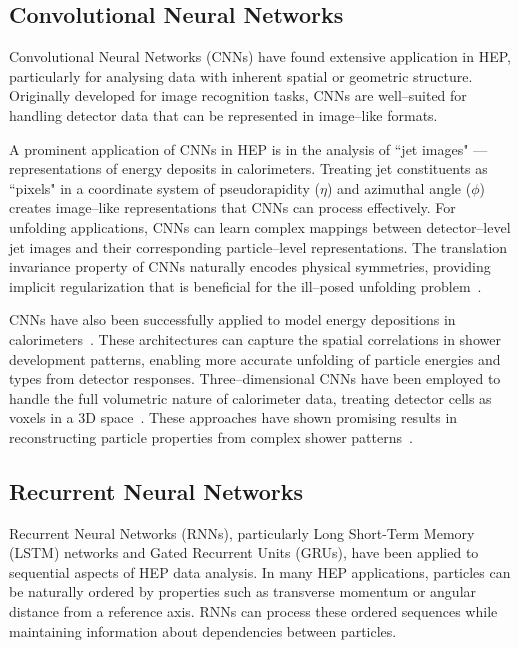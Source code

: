 \subsection{Convolutional Neural Networks}
    Convolutional Neural Networks (CNNs) have found extensive application in HEP, particularly for analysing data with inherent spatial or geometric structure.
    Originally developed for image recognition tasks, CNNs are well--suited for handling detector data that can be represented in image--like formats.
    
    A prominent application of CNNs in HEP is in the analysis of ``jet images" --- representations of energy deposits in calorimeters.
    Treating jet constituents as ``pixels" in a coordinate system of pseudorapidity (\(\eta\)) and azimuthal angle (\(\phi\)) creates image--like representations that CNNs can process effectively.
    For unfolding applications, CNNs can learn complex mappings between detector--level jet images and their corresponding particle--level representations.
    The translation invariance property of CNNs naturally encodes physical symmetries, providing implicit regularization that is beneficial for the ill--posed unfolding problem~\cite{wu_dense_2021}.
    
    CNNs have also been successfully applied to model energy depositions in calorimeters~\cite{bhattacherjee_study_2019}.
    These architectures can capture the spatial correlations in shower development patterns, enabling more accurate unfolding of particle energies and types from detector responses.
    Three--dimensional CNNs have been employed to handle the full volumetric nature of calorimeter data, treating detector cells as voxels in a 3D space~\cite{yang_application_2024}.
    These approaches have shown promising results in reconstructing particle properties from complex shower patterns~\cite{noauthor_deep_nodate, shi_pointrcnn_2019}.
\subsection{Recurrent Neural Networks}
    Recurrent Neural Networks (RNNs), particularly Long Short-Term Memory (LSTM) networks and Gated Recurrent Units (GRUs), have been applied to sequential aspects of HEP data analysis.
    In many HEP applications, particles can be naturally ordered by properties such as transverse momentum or angular distance from a reference axis.
    RNNs can process these ordered sequences while maintaining information about dependencies between particles.

